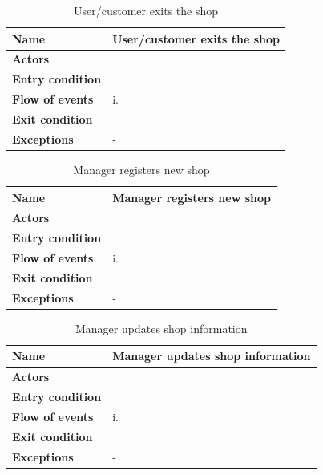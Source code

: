 \begin{table}[h!]
    \centering
    \begin{tabular}{@{}P{0.2\textwidth}P{0.70\textwidth}@{}}
        \toprule
        \textbf{Name}                 & User/customer exits the shop\\
        \midrule
        \textbf{Actors}               & \\
        \textbf{Entry condition}      & \\
        \textbf{Flow of events}            
        & i.\\
        \textbf{Exit condition}       & \\
        \textbf{Exceptions}           
        & - \\
        \bottomrule
    \end{tabular}
\caption{User/customer exits the shop}
\label{table:exitshop}
\end{table}

\begin{table}[h!]
    \centering
    \begin{tabular}{@{}P{0.2\textwidth}P{0.70\textwidth}@{}}
        \toprule
        \textbf{Name}                 & Manager registers new shop\\
        \midrule
        \textbf{Actors}               & \\
        \textbf{Entry condition}      & \\
        \textbf{Flow of events}            
        & i.\\
        \textbf{Exit condition}       & \\
        \textbf{Exceptions}           
        & - \\
        \bottomrule
    \end{tabular}
\caption{Manager registers new shop}
\label{table:managerregisternewshop}
\end{table}

\begin{table}[h!]
    \centering
    \begin{tabular}{@{}P{0.2\textwidth}P{0.70\textwidth}@{}}
        \toprule
        \textbf{Name}                 & Manager updates shop information\\
        \midrule
        \textbf{Actors}               & \\
        \textbf{Entry condition}      & \\
        \textbf{Flow of events}            
        & i.\\
        \textbf{Exit condition}       & \\
        \textbf{Exceptions}           
        & - \\
        \bottomrule
    \end{tabular}
\caption{Manager updates shop information}
\label{table:managerupdatesshopinformation}
\end{table}

